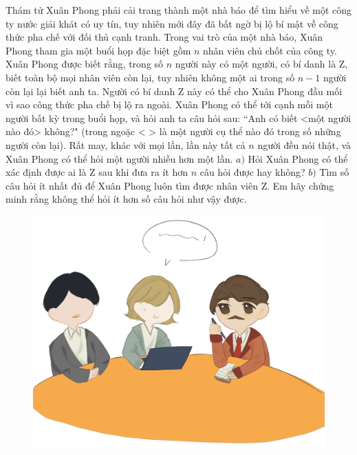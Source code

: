 \centering
\endgroup
\vspace*{25pt} 
\begin{multicols}{2}
	Thám tử Xuân Phong phải cải trang thành một nhà báo để tìm hiểu về một công ty nước giải khát có uy tín, tuy nhiên mới đây đã bất ngờ bị lộ bí mật về công thức pha chế với đối thủ cạnh tranh. Trong vai trò của một nhà báo, Xuân Phong tham gia một buổi họp đặc biệt gồm $n$ nhân viên chủ chốt của công ty. Xuân Phong được biết rằng, trong số $n$ người này có một người, có bí danh là Z, biết toàn bộ mọi nhân viên còn lại, tuy nhiên không một ai trong số $n-1$ người còn lại lại biết anh ta. Người có bí danh Z này có thể cho Xuân Phong đầu mối vì sao công thức pha chế bị lộ ra ngoài.
	\vskip 0.1cm
	Xuân Phong có thể tới cạnh mỗi một người bất kỳ trong buổi họp, và hỏi anh ta câu hỏi sau: ``Anh có biết <một người nào đó> không?" (trong ngoặc < > là một người cụ thể nào đó trong số những người còn lại). Rất may, khác với mọi lần, lần này  tất cả $n$ người đều nói thật, và Xuân Phong có thể hỏi một người nhiều hơn một lần.
	\vskip 0.1cm
	$a)$ Hỏi Xuân Phong có thể xác định được ai là Z sau khi đưa ra ít hơn $n$ câu hỏi được hay không?
	\vskip 0.1cm
	$b)$ Tìm số câu hỏi ít nhất đủ để Xuân Phong luôn tìm được nhân viên Z. Em hãy chứng minh rằng không thể hỏi ít hơn số câu hỏi như vậy được.
	
	\begin{figure}[H]
		\centering
		\vspace*{-5pt}
		\captionsetup{labelformat= empty, justification=centering}
		\includegraphics[width=1\linewidth]{xp}
		\vspace*{-15pt}
	\end{figure}
\end{multicols}
